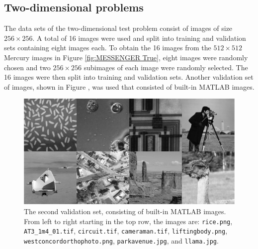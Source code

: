 \documentclass[12pt]{article}
\begin{document}
\subsection{Two-dimensional problems} \label{sec:2D}

The data sets of the two-dimensional test problem consist of images of size $256 \times 256$. A total of 16 images were used and split into training and validation sets containing eight images each. To obtain the 16 images from the $512 \times 512$ Mercury images in Figure \ref{fig:MESSENGER True}, eight images were randomly chosen and two $256 \times 256$ subimages of each image were randomly selected. The 16 images were then split into training and validation sets. Another validation set of images, shown in Figure , was used that consisted of built-in MATLAB images.

\begin{figure}[ht]
\includegraphics[width=1.0\textwidth]{Figures/ValidationSet2.pdf}
\caption{The second validation set, consisting of built-in MATLAB images. From left to right starting in the top row, the images are: \texttt{rice.png}, \texttt{AT3\_1m4\_01.tif}, \texttt{circuit.tif}, \texttt{cameraman.tif}, \texttt{liftingbody.png}, \texttt{westconcordorthophoto.png}, \texttt{parkavenue.jpg}, and \texttt{llama.jpg}.}
\label{fig:Validation Set 2}
\end{figure}
\end{document}
